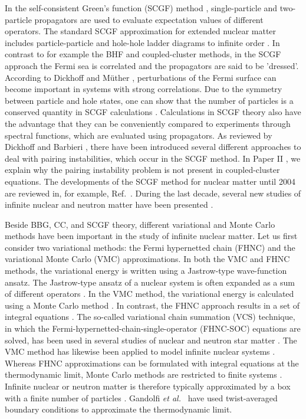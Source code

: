 \documentclass[a4paper,12pt]{report}
\begin{document}
In the self-consistent Green's function (SCGF) method 
\cite{dickhoff1992,muther2000,dickhoff2004}, single-particle
and two-particle propagators are used to evaluate expectation
values of different operators. The standard SCGF 
approximation for extended nuclear matter includes 
particle-particle and hole-hole ladder diagrams to infinite 
order \cite{dickhoff2004}. In contrast to for
example the BHF and coupled-cluster methods, in the SCGF
approach the Fermi sea is correlated and the propagators
are said to be 'dressed'. According to Dickhoff and 
M{\"u}ther \cite{dickhoff1992}, perturbations of the Fermi
surface can become important in systems with strong 
correlations. Due to the symmetry between particle and 
hole states, one can show that the number of particles
is a conserved quantity in SCGF calculations 
\cite{dickhoff1992}. Calculations in SCGF theory also have 
the advantage that they can be conveniently compared to 
experiments through spectral functions, which are evaluated 
using propagators. As reviewed by Dickhoff and Barbieri 
\cite{dickhoff2004}, there have been introduced several
different approaches to deal with pairing instabilities, which 
occur in the SCGF method. In Paper II \cite{baardsen}, we 
explain why the pairing instability problem is not present
in coupled-cluster equations.  The developments of the 
SCGF method for nuclear matter until 2004 are reviewed in, 
for example, Ref.~\cite{dickhoff2004}. During the last 
decade, several new studies of infinite 
nuclear and neutron matter have been presented 
\cite{bozek2004,hassaneen2004,
frick2005,bozek2006,soma2006,gad2007,soma2008,soma2009,
soma2009b,rios2009,carbone2012,carbone2013}. 

Beside BBG, CC, and SCGF theory, different variational 
and Monte Carlo methods have been important 
in the study of infinite nuclear matter. Let us first 
consider two variational methods: the Fermi hypernetted 
chain (FHNC) \cite{fantoni1998} and the variational Monte 
Carlo (VMC) \cite{pieper1998} approximations. In both the 
VMC and FHNC methods, the variational energy is written 
using a Jastrow-type wave-function ansatz. The Jastrow-type
ansatz of a nuclear system is often expanded as a sum 
of different operators \cite{pieper1998,fantoni1998}. 
In the VMC method, the variational energy is calculated 
using a Monte Carlo method \cite{pieper1998}. 
In contrast, the FHNC approach
results in a set of integral equations \cite{fantoni1998}.
The so-called variational chain summation (VCS) technique,
in which the Fermi-hypernetted-chain-single-operator
(FHNC-SOC) equations are solved, has been used in several
studies of nuclear and neutron star matter 
\cite{pandharipande1979,wiringa1988,akmal1997,
akmal1998,carlson_2003}. The VMC method has likewise been
applied to model infinite nuclear systems \cite{carlson_2003}. 
Whereas FHNC approximations can be formulated with integral 
equations at the thermodynamic limit, Monte Carlo methods are 
restricted to finite systems \cite{fantoni1998}. Infinite 
nuclear or neutron matter is therefore typically 
approximated by a box with a finite number of particles 
\cite{carlson_2003,gandolfi2007,gandolfi_2009}. Gandolfi 
\emph{et al.}~\cite{gandolfi_2009} have used twist-averaged 
boundary conditions to approximate the thermodynamic limit.
\end{document}
